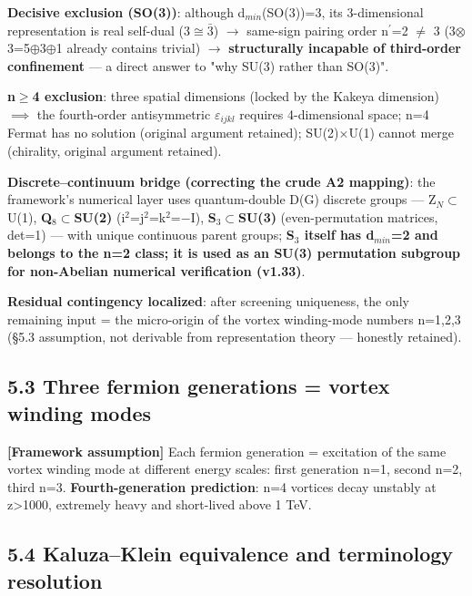 \documentclass[12pt]{article}
\newcommand{\mtag}[1]{\textbf{[#1]}}
\newcommand{\up}[1]{\ensuremath{^{#1}}}
\newcommand{\down}[1]{\ensuremath{_{#1}}}
\begin{document}
\textbf{Decisive exclusion (SO(3))}: although d\down{min}(SO(3))=3, its 3-dimensional representation is real self-dual (3\ensuremath{\cong}\ensuremath{\bar{3}}) \ensuremath{\to} same-sign pairing order n\ensuremath{^\prime}=2 \ensuremath{\neq} 3 (3\ensuremath{\otimes}3=5\ensuremath{\oplus}3\ensuremath{\oplus}1 already contains trivial) \ensuremath{\to} \textbf{structurally incapable of third-order confinement} --- a direct answer to "why SU(3) rather than SO(3)".

\textbf{n\ensuremath{\geq}4 exclusion}: three spatial dimensions (locked by the Kakeya dimension) \ensuremath{\implies} the fourth-order antisymmetric \ensuremath{\varepsilon}\down{ijkl} requires 4-dimensional space; n=4 Fermat has no solution (original argument retained); SU(2)\ensuremath{\times}U(1) cannot merge (chirality, original argument retained).

\textbf{Discrete--continuum bridge (correcting the crude A2 mapping)}: the framework's numerical layer uses quantum-double D(G) discrete groups --- Z\down{N}\ensuremath{\subset}U(1), \textbf{Q\down{8}\ensuremath{\subset}SU(2)} (i\up{2}=j\up{2}=k\up{2}=\ensuremath{-}I), \textbf{S\down{3}\ensuremath{\subset}SU(3)} (even-permutation matrices, det=1) --- with unique continuous parent groups; \textbf{S\down{3} itself has d\down{min}=2 and belongs to the n=2 class; it is used as an SU(3) permutation subgroup for non-Abelian numerical verification (v1.33)}.

\textbf{Residual contingency localized}: after screening uniqueness, the only remaining input = the micro-origin of the vortex winding-mode numbers n=1,2,3 (\S{}5.3 assumption, not derivable from representation theory --- honestly retained).

\subsection{5.3 Three fermion generations = vortex winding modes}

\mtag{Framework assumption} Each fermion generation = excitation of the same vortex winding mode at different energy scales: first generation n=1, second n=2, third n=3. \textbf{Fourth-generation prediction}: n=4 vortices decay unstably at z>1000, extremely heavy and short-lived above 1 TeV.

\subsection{5.4 Kaluza--Klein equivalence and terminology resolution}
\end{document}
